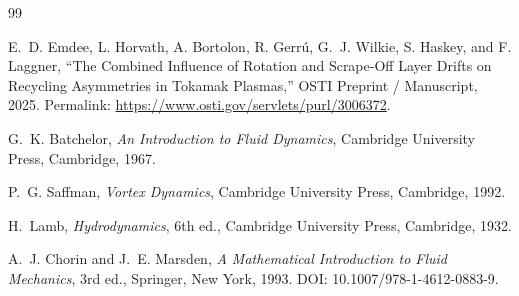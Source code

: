 \documentclass[11pt]{article}
\begin{document}
        \begin{thebibliography}{99}
            
            E.~D. Emdee, L. Horvath, A. Bortolon, R. Gerr\'u, G.~J. Wilkie, S. Haskey, and F. Laggner,
            \newblock ``The Combined Influence of Rotation and Scrape-Off Layer Drifts on Recycling Asymmetries in Tokamak Plasmas,''
            \newblock OSTI Preprint / Manuscript, 2025.
            \newblock Permalink: \url{https://www.osti.gov/servlets/purl/3006372}.
            
            G.~K. Batchelor,
            \newblock \emph{An Introduction to Fluid Dynamics},
            \newblock Cambridge University Press, Cambridge, 1967.
            
            P.~G. Saffman,
            \newblock \emph{Vortex Dynamics},
            \newblock Cambridge University Press, Cambridge, 1992.
            
            H.~Lamb,
            \newblock \emph{Hydrodynamics},
            \newblock 6th ed., Cambridge University Press, Cambridge, 1932.
            
            A.~J. Chorin and J.~E. Marsden,
            \newblock \emph{A Mathematical Introduction to Fluid Mechanics},
            \newblock 3rd ed., Springer, New York, 1993.
            \newblock DOI: 10.1007/978-1-4612-0883-9.
        
        \end{thebibliography}
\end{document}
